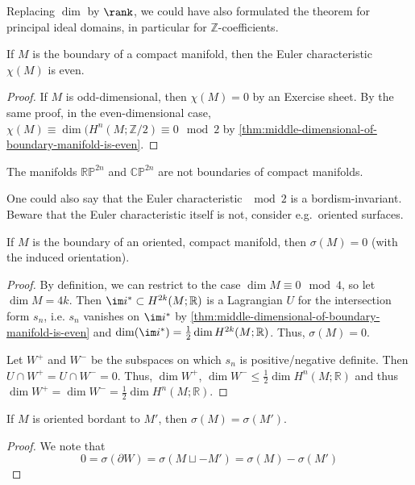 \begin{remark}
  Replacing $\dim$ by $\rank$, we could have also formulated
  the theorem for principal ideal domains,
  in particular for $\mathbb{Z}$-coefficients.
\end{remark}

\begin{corollary}
  If $M$ is the boundary of a compact manifold,
  then the Euler characteristic $\chi(M)$ is even.
\end{corollary}

\begin{proof}
  If $M$ is odd-dimensional,
  then $\chi(M) = 0$ by an Exercise sheet.
  By the same proof, in the even-dimensional case,
  $\chi(M) \equiv \dim (H^n (M ; \mathbb{Z} / 2) \equiv 0 \mod 2$ by
  \autoref{thm:middle-dimensional-of-boundary-manifold-is-even}.
\end{proof}

\begin{corollary}
  The manifolds $\mathbb{R}\mathbb{P}^{2n}$ and $\mathbb{C}\mathbb{P}^{2n}$
  are not boundaries of compact manifolds.
\end{corollary}

\begin{remark}
  One could also say that the Euler characteristic $\mod 2$ is a
  bordism-invariant.
  Beware that the Euler characteristic itself is not,
  consider e.g.~oriented surfaces.
\end{remark}

\begin{corollary}
  If $M$ is the boundary of an oriented,
  compact manifold, then $σ(M) = 0$
  (with the induced orientation).
\end{corollary}

\begin{proof}
  By definition, we can restrict to the case $\dim M \equiv 0 \mod 4$,
  so let $\dim M = 4k$.
  Then $\im i^* \subset H^{2k}(M ; \mathbb{R})$ is a Lagrangian $U$
  for the intersection form $s_n$, i.e. $s_n$ vanishes on
  $\im i^*$ by
  \autoref{thm:middle-dimensional-of-boundary-manifold-is-even}
  and $\dim ( \im i^*) = \frac{1}{2} \dim H^{2k}(M ; \mathbb{R})$.
  Thus, $σ(M) = 0$.

  Let $W^+$ and $W^-$ be the subspaces on which $s_n$ is
  positive/negative definite.
  Then $U\cap W^+ = U \cap W^- = 0$.
  Thus, $\dim W^+$, $\dim W^- \leq \frac{1}{2} \dim H^n(M ; \mathbb{R})$
  and thus $\dim W^+ = \dim W^- = \frac{1}{2} \dim H^n(M; \mathbb{R})$.
\end{proof}

\begin{corollary}
  If $M$ is oriented bordant to $M'$,
  then $σ(M) = σ(M')$.
\end{corollary}

\begin{proof}
  We note that
  \[
    0 = σ ( \partial W)
    = σ ( M \sqcup - M')
    = σ(M) - σ(M')
  \] 
\end{proof}

